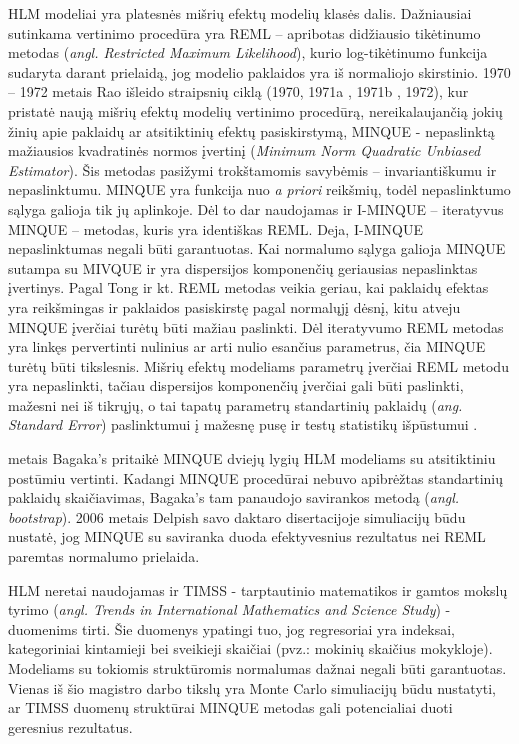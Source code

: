 \documentclass[11pt,a4paper]{article}
\begin{document}
\indent HLM modeliai yra platesnės mišrių efektų modelių klasės dalis. Dažniausiai sutinkama vertinimo procedūra yra REML -- apribotas didžiausio tikėtinumo metodas (\textit{angl. Restricted Maximum Likelihood}), kurio log-tikėtinumo funkcija sudaryta darant prielaidą, jog modelio paklaidos yra iš normaliojo skirstinio. 1970 -- 1972 metais Rao išleido straipsnių ciklą  (1970\cite{rao1970}, 1971a\cite{rao1971a} , 1971b\cite{rao1971b} , 1972\cite{rao1972}), kur pristatė naują mišrių efektų modelių vertinimo procedūrą, nereikalaujančią jokių žinių apie paklaidų ar atsitiktinių efektų pasiskirstymą, MINQUE - nepaslinktą mažiausios kvadratinės normos įvertinį (\textit{Minimum Norm Quadratic Unbiased Estimator}). Šis metodas pasižymi trokštamomis savybėmis -- invariantiškumu ir nepaslinktumu. MINQUE yra funkcija nuo \textit{a priori} reikšmių, todėl nepaslinktumo sąlyga galioja tik jų aplinkoje. Dėl to dar naudojamas ir I-MINQUE -- iteratyvus MINQUE -- metodas, kuris yra identiškas REML. Deja, I-MINQUE nepaslinktumas negali būti garantuotas. Kai normalumo sąlyga galioja MINQUE sutampa su MIVQUE ir yra dispersijos komponenčių geriausias nepaslinktas įvertinys\cite{rao1971b}. Pagal Tong ir kt. \cite{MLbetterMINQUE} REML metodas veikia geriau, kai paklaidų efektas yra reikšmingas ir paklaidos pasiskirstę pagal normalųjį dėsnį, kitu atveju MINQUE įverčiai turėtų būti mažiau paslinkti. Dėl iteratyvumo REML metodas yra linkęs pervertinti nulinius ar arti nulio esančius parametrus, čia MINQUE turėtų būti tikslesnis. Mišrių efektų modeliams parametrų įverčiai REML metodu yra nepaslinkti, tačiau dispersijos komponenčių įverčiai gali būti paslinkti, mažesni nei iš tikrųjų, o tai tapatų parametrų standartinių paklaidų (\textit{ang. Standard Error}) paslinktumui į mažesnę pusę ir  testų statistikų išpūstumui \cite{downwardbias}.

 metais Bagaka's\cite{bagaka} pritaikė MINQUE dviejų lygių HLM modeliams su atsitiktiniu postūmiu vertinti. Kadangi MINQUE procedūrai nebuvo apibrėžtas standartinių paklaidų skaičiavimas, Bagaka's tam panaudojo savirankos metodą (\textit{angl. bootstrap}). 2006 metais Delpish\cite{delpish} savo daktaro disertacijoje simuliacijų būdu nustatė, jog MINQUE su saviranka duoda efektyvesnius rezultatus nei REML paremtas normalumo prielaida.

\indent HLM neretai naudojamas ir TIMSS - tarptautinio matematikos ir gamtos mokslų tyrimo (\textit{angl. Trends in International Mathematics and Science Study}) - duomenims tirti. Šie duomenys ypatingi tuo, jog regresoriai yra indeksai, kategoriniai kintamieji bei sveikieji skaičiai (pvz.: mokinių skaičius mokykloje)\cite{timssug}. Modeliams su tokiomis struktūromis normalumas dažnai negali būti garantuotas.  Vienas iš šio magistro darbo tikslų yra Monte Carlo simuliacijų būdu nustatyti, ar TIMSS duomenų struktūrai MINQUE metodas gali potencialiai duoti geresnius rezultatus.
\end{document}
